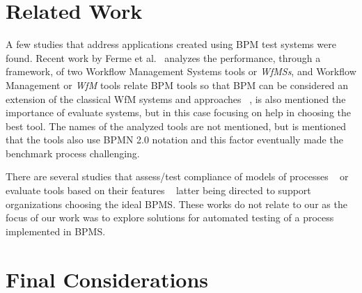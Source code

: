 \documentclass[runningheads,a4paper]{llncs}
\begin{document}
\section{Related Work}
A few studies that address applications created using BPM test systems were found. Recent work by Ferme et al.~\cite{bpmbenchmarking} analyzes the performance, through a framework, of two Workflow Management Systems tools or \emph{WfMSs}, and Workflow Management or \emph{WfM} tools relate BPM tools so that BPM can be considered an extension of the classical WfM systems and approaches ~\cite{wfm}, is also mentioned the importance of evaluate systems, but in this case focusing on help in choosing the best tool. The names of the analyzed tools are not mentioned, but is mentioned that the tools also use BPMN 2.0 notation and this factor eventually made the benchmark process challenging.


There are several studies that assess/test compliance of models of processes ~\cite{conformancetesting} 
or evaluate tools based on their features ~\cite{comparingbpms} latter being directed to support organizations choosing the ideal BPMS. These works do not relate to our as the focus of our work was to explore solutions for automated testing of a process implemented in BPMS.


\section{Final Considerations}\label{s:conclu}
\end{document}
